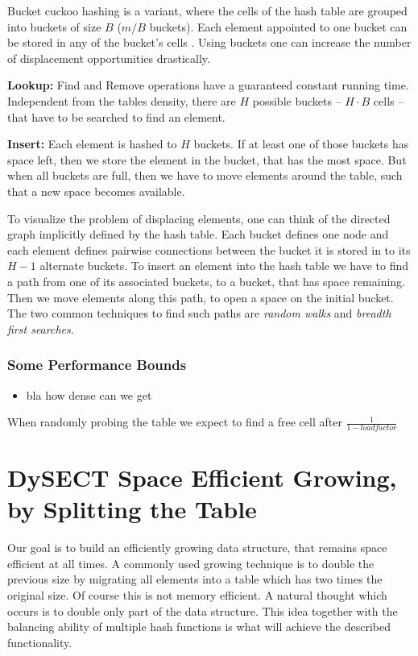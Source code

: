 \documentclass[a4paper,UKenglish]{lipics-v2016}
\begin{document}
Bucket cuckoo hashing is a variant, where the cells of the hash table
are grouped into buckets of size $B$ ($m/B$ buckets).  Each element
appointed to one bucket can be stored in any of the bucket's cells .
Using buckets one can increase the number of displacement
opportunities drastically.

\textbf{Lookup:} Find and Remove operations have a guaranteed constant
running time. Independent from the tables density, there are $H$
possible buckets -- $H\cdot B$ cells -- that have to be searched to
find an element.

\textbf{Insert:} Each element is hashed to $H$ buckets.  If at least
one of those buckets has space left, then we store the element in the
bucket, that has the most space.  But when all buckets are full, then we
have to move elements around the table, such that a new space becomes
available.

To visualize the problem of displacing elements, one can think of the
directed graph implicitly defined by the hash table.  Each bucket
defines one node and each element defines pairwise connections between
the bucket it is stored in to its $H-1$ alternate buckets.  To insert
an element into the hash table we have to find a path from one of its
associated buckets, to a bucket, that has space remaining.  Then we
move elements along this path, to open a space on the initial bucket.
The two common techniques to find such paths are \emph{random walks} and
\emph{breadth first searches}.

\subsubsection*{Some Performance Bounds}
\begin{itemize}
\item bla how dense can we get
\end{itemize}

When randomly probing the table we expect to find a free cell after $\frac{1}{1-load factor}$

\section{DySECT Space Efficient Growing, by Splitting the Table}
Our goal is to build an efficiently growing data structure, that
remains space efficient at all times.  A commonly used growing
technique is to double the previous size by migrating all elements
into a table which has two times the original size.  Of course this is
not memory efficient.  A natural thought which occurs is to double
only part of the data structure.  This idea together with the
balancing ability of multiple hash functions is what will achieve the
described functionality.
\end{document}
